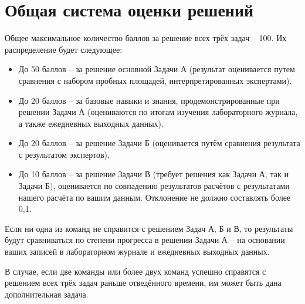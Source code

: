 \section{Общая система оценки решений}

Общее максимальное количество баллов за решение всех трёх задач – 100. Их распределение будет следующее:
\begin{itemize}
    \item До 50 баллов – за решение основной Задачи А (результат оценивается путем сравнения с набором пробных площадей, интерпретированных экспертами).
    \item До 20 баллов – за базовые навыки и знания, продемонстрированные при решении Задачи А (оцениваются по итогам изучения лабораторного журнала, а также ежедневных выходных данных).
    \item До 20 баллов – за решение Задачи Б (оценивается путём сравнения результата с результатом экспертов).
    \item До 10 баллов – за решение Задачи В (требует решения как Задачи А, так и Задачи Б), оценивается по совпадению результатов расчётов с результатами нашего расчёта по вашим данным. Отклонение не должно составлять более 0,1.
\end{itemize}

Если ни одна из команд не справится с решением Задач А, Б и В, то результаты будут сравниваться по степени прогресса в решении Задачи А – на основании ваших записей в лабораторном журнале и ежедневных выходных данных.

В случае, если две команды или более двух команд успешно справятся с решением всех трёх задач раньше отведённого времени, им может быть дана дополнительная задача.